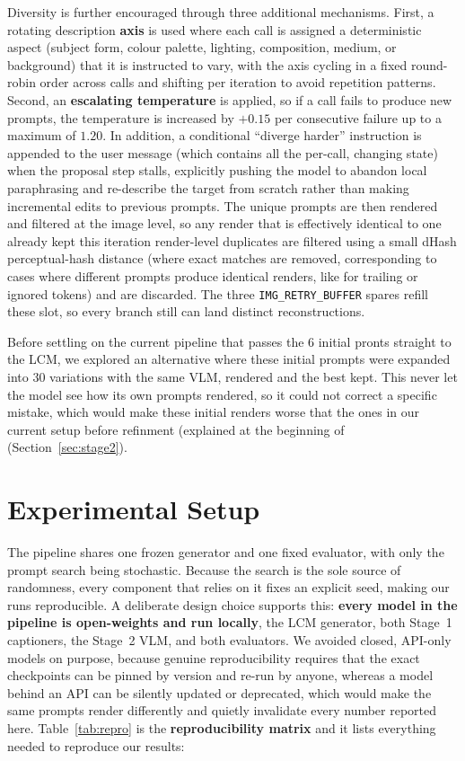 \documentclass[runningheads]{llncs}
\begin{document}
\noindent
Diversity is further encouraged through three additional mechanisms. First, a rotating description \textbf{axis} is used where each call is assigned a deterministic aspect (subject form, colour palette, lighting, composition, medium, or background) that it is instructed to vary, with the axis cycling in a fixed round-robin order across calls and shifting per iteration to avoid repetition patterns. Second, an \textbf{escalating temperature} is applied, so if a call fails to produce new prompts, the temperature is increased by $+0.15$ per consecutive failure up to a maximum of $1.20$. In addition, a conditional “diverge harder” instruction is appended to the user message (which contains all the per-call, changing state) when the proposal step stalls, explicitly pushing the model to abandon local paraphrasing and re-describe the target from scratch rather than making incremental edits to previous prompts. The unique prompts are then rendered and filtered at the image level, so any render that is effectively identical to one already kept this iteration render-level duplicates are filtered using a small dHash perceptual-hash distance (where exact matches are removed, corresponding to cases where different prompts produce identical renders, like for trailing or ignored tokens) and are discarded. The three \texttt{IMG\_RETRY\_BUFFER} spares refill these slot, so every branch still can land distinct reconstructions.

\noindent
Before settling on the current pipeline that passes the 6 initial pronts straight to the LCM, we explored an alternative where these initial prompts were expanded into 30 variations with the same VLM, rendered and the best kept. This never let the model see how its own prompts rendered, so it could not correct a specific mistake, which would make these initial renders worse that the ones in our current setup before refinment (explained at the beginning of (Section~\ref{sec:stage2}).

\section{Experimental Setup}
The pipeline shares one frozen generator and one fixed evaluator, with only the prompt search being stochastic. Because the search is the sole source of randomness, every component that relies on it fixes an explicit seed, making our runs reproducible. A deliberate design choice supports this: \textbf{every model in the pipeline is open-weights and run locally}, the LCM generator, both Stage~1 captioners, the Stage~2 VLM, and both evaluators. We avoided closed, API-only models on purpose, because genuine reproducibility requires that the exact checkpoints can be pinned by version and re-run by anyone, whereas a model behind an API can be silently updated or deprecated, which would make the same prompts render differently and quietly invalidate every number reported here. Table~\ref{tab:repro} is the \textbf{reproducibility matrix} and it lists everything needed to reproduce our results:
\end{document}
